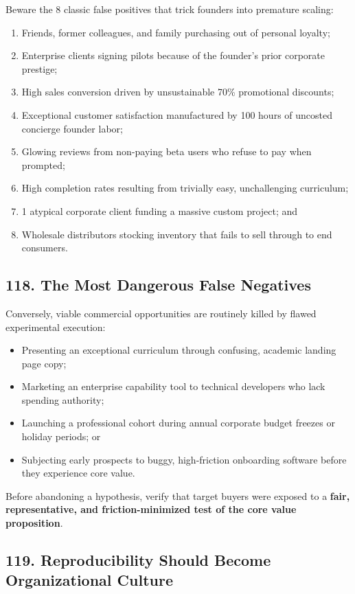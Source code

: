 Beware the 8 classic false positives that trick founders into premature scaling:
\begin{enumerate}
    \item Friends, former colleagues, and family purchasing out of personal loyalty;
    \item Enterprise clients signing pilots because of the founder's prior corporate prestige;
    \item High sales conversion driven by unsustainable 70\% promotional discounts;
    \item Exceptional customer satisfaction manufactured by 100 hours of uncosted concierge founder labor;
    \item Glowing reviews from non-paying beta users who refuse to pay when prompted;
    \item High completion rates resulting from trivially easy, unchallenging curriculum;
    \item 1 atypical corporate client funding a massive custom project; and
    \item Wholesale distributors stocking inventory that fails to sell through to end consumers.
\end{enumerate}

\subsection*{118. The Most Dangerous False Negatives}

Conversely, viable commercial opportunities are routinely killed by flawed experimental execution:
\begin{itemize}
    \item Presenting an exceptional curriculum through confusing, academic landing page copy;
    \item Marketing an enterprise capability tool to technical developers who lack spending authority;
    \item Launching a professional cohort during annual corporate budget freezes or holiday periods; or
    \item Subjecting early prospects to buggy, high-friction onboarding software before they experience core value.
\end{itemize}

Before abandoning a hypothesis, verify that target buyers were exposed to a \textbf{fair, representative, and friction-minimized test of the core value proposition}.

\subsection*{119. Reproducibility Should Become Organizational Culture}

